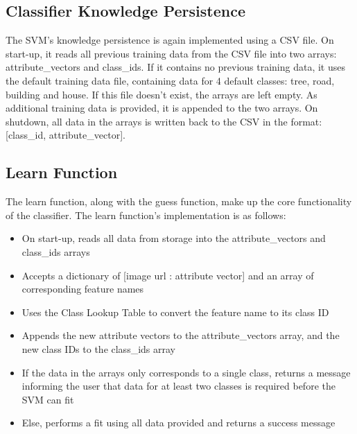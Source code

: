 \subsection{Classifier Knowledge Persistence}
The SVM’s knowledge persistence is again implemented using a CSV file. 
On start-up, it reads all previous training data from the CSV file into two arrays: attribute\_vectors and class\_ids. If it contains no previous training data, it uses the default training data file, containing data for 4 default classes: tree, road, building and house. If this file doesn’t exist, the arrays are left empty.
As additional training data is provided, it is appended to the two arrays. On shutdown, all data in the arrays is written back to the CSV in the format: [class\_id, attribute\_vector].

\subsection{Learn Function}
The learn function, along with the guess function, make up the core functionality of the classifier. The learn function’s implementation is as follows:
\begin{itemize}
    \item On start-up, reads all data from storage into the attribute\_vectors and class\_ids arrays
    \item Accepts a dictionary of [image url : attribute vector] and an array of corresponding feature names 
    \item Uses the Class Lookup Table to convert the feature name to its class ID
    \item Appends the new attribute vectors to the attribute\_vectors array, and the new class IDs to the class\_ids array
    \item If the data in the arrays only corresponds to a single class, returns a message informing the user that data for at least two classes is required before the SVM can fit 
    \item Else, performs a fit using all data provided and returns a success message
\end{itemize}

